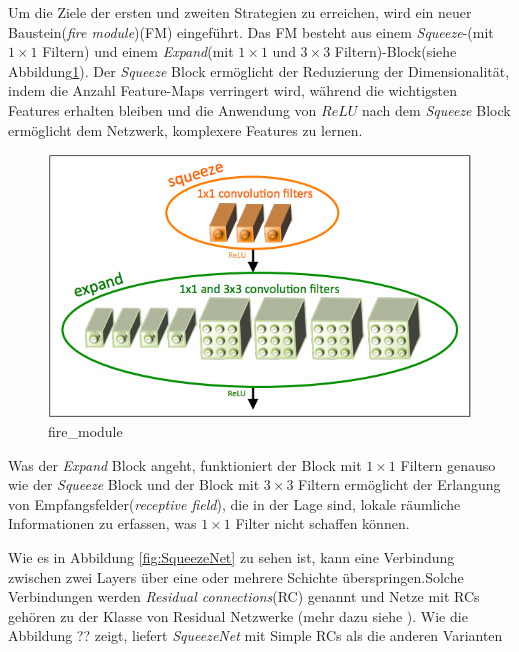 \documentclass[12pt,a4paper]{scrartcl}
\numberwithin{equation}{section}
\begin{document}
Um die Ziele der ersten und zweiten Strategien zu erreichen, wird ein neuer Baustein(\textit{fire module})(FM) eingeführt. Das FM besteht aus einem \textit{Squeeze}-(mit $ 1\times1 $ Filtern) und einem \textit{Expand}(mit $ 1\times1 $ und $ 3\times3 $ Filtern)-Block(siehe Abbildung\ref{fig:fire_module}). Der \textit{Squeeze} Block ermöglicht der Reduzierung der Dimensionalität, indem die Anzahl Feature-Maps verringert wird, während die wichtigsten Features erhalten bleiben und die Anwendung von $ ReLU $ nach dem \textit{Squeeze} Block ermöglicht dem Netzwerk, komplexere Features zu lernen.

\begin{figure}[h]
	\centering
	\includegraphics[width=\textwidth ]{fire_module}
	\caption{ fire\_module \cite{SqueezeNet} }
	\label{fig:fire_module}
\end{figure}

Was der \textit{Expand} Block angeht, funktioniert der Block mit $ 1\times1 $ Filtern genauso wie der \textit{Squeeze} Block und der Block mit $ 3\times3 $ Filtern ermöglicht der Erlangung von Empfangsfelder(\textit{receptive field}), die in der Lage sind, lokale räumliche Informationen zu erfassen, was $ 1\times1 $ Filter nicht schaffen können.

Wie es in Abbildung \ref{fig:SqueezeNet} zu sehen ist, kann eine Verbindung zwischen zwei Layers über eine oder mehrere Schichte überspringen.Solche Verbindungen werden \textit{Residual connections}(RC) genannt und Netze mit RCs gehören zu der Klasse von Residual Netzwerke (mehr dazu siehe \cite{ResNet}).
Wie die Abbildung ?? zeigt, liefert \textit{SqueezeNet} mit Simple RCs  als die anderen Varianten
\end{document}
